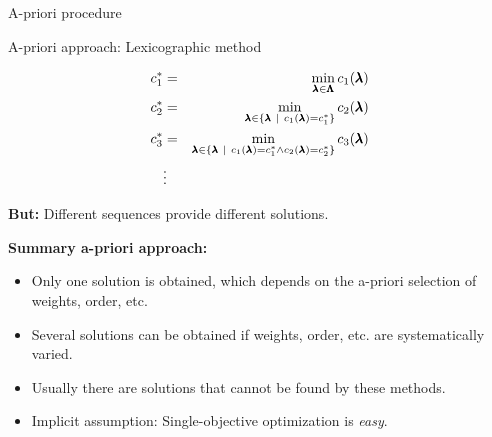 \begin{frame}[allowframebreaks]{A-priori procedure}
\framebreak

A-priori approach: Lexicographic method

\begin{eqnarray*}
c_1^* &=& \min_{\pmb{\lambda} \in \pmb{\Lambda}} c_1(\pmb{\lambda})\\
c_2^* &=& \min_{\pmb{\lambda} \in \{\pmb{\lambda} ~|~ c_1(\pmb{\lambda}) = c_1^*\}} c_2(\pmb{\lambda}) \\
c_3^* &=& \min_{\pmb{\lambda} \in \{\pmb{\lambda} ~|~ c_1(\pmb{\lambda}) = c_1^* \land c_2(\pmb{\lambda}) = c_2^*\}} c_3(\pmb{\lambda}) \\
&\vdots&
\end{eqnarray*}

    \textbf{But:} Different sequences provide different solutions.

\framebreak

\textbf{Summary a-priori approach:}
\begin{itemize}
\item Only one solution is obtained, which depends on the a-priori selection of weights, order, etc.
\item Several solutions can be obtained if weights, order, etc. are systematically varied.
\item Usually there are solutions that cannot be found by these methods.
\item Implicit assumption: Single-objective optimization is \emph{easy}.
\end{itemize}

\end{frame}

